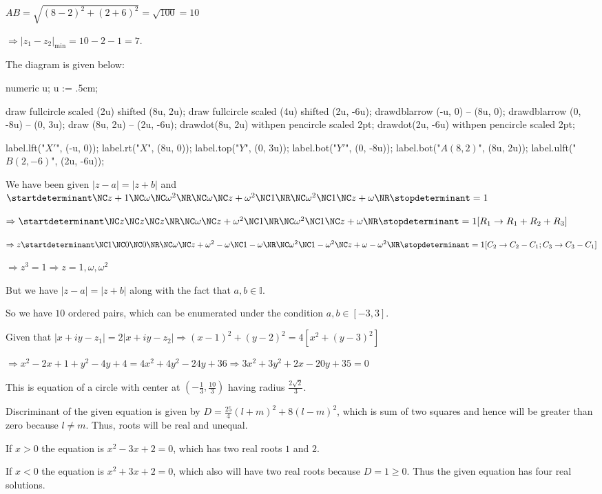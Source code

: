   $AB = \sqrt{(8 - 2)^2 + (2 + 6)^2} = \sqrt{100} = 10$

  $\Rightarrow |z_1 - z_2|_{\min} = 10 - 2 - 1 = 7$.

  The diagram is given below:

  \startplacefigure[location=force]
    \startMPcode
      numeric u;
      u := .5cm;

      draw fullcircle scaled (2u) shifted (8u, 2u);
      draw fullcircle scaled (4u) shifted (2u, -6u);
      drawdblarrow (-u, 0) -- (8u, 0);
      drawdblarrow (0, -8u) -- (0, 3u);
      draw (8u, 2u) -- (2u, -6u);
      drawdot(8u, 2u) withpen pencircle scaled 2pt;
      drawdot(2u, -6u) withpen pencircle scaled 2pt;

      label.lft("$X'$", (-u, 0));
      label.rt("$X$", (8u, 0));
      label.top("$Y$", (0, 3u));
      label.bot("$Y'$", (0, -8u));
      label.bot("$A(8, 2)$", (8u, 2u));
      label.ulft("$B(2, -6)$", (2u, -6u));
    \stopMPcode
  \stopplacefigure
\item We have been given $|z - a| = |z + b|$ and $\startdeterminant\NC z +
  1\NC \omega\NC \omega^2 \NR\NC \omega\NC z + \omega^2 \NC 1\NR\NC \omega^2\NC 1\NC z
  + \omega\NR\stopdeterminant = 1$

  $\Rightarrow \startdeterminant\NC z \NC z\NC z \NR\NC \omega\NC z + \omega^2 \NC 1\NR\NC \omega^2\NC 1\NC
  z + \omega\NR\stopdeterminant = 1[R_1\rightarrow R_1 + R_2 + R_3]$

  $\Rightarrow z\startdeterminant\NC 1\NC 0\NC 0\NR\NC \omega\NC z + \omega^2 - \omega\NC 1
  - \omega\NR\NC \omega^2 \NC 1 - \omega^2\NC z + \omega -\omega^2\NR\stopdeterminant = 1[C_2\rightarrow C_2
    - C_1; C_3\rightarrow C_3 - C_1]$

  $\Rightarrow z^3 = 1 \Rightarrow z = 1, \omega, \omega^2$

  But we have $|z - a| = |z + b|$ along with the fact that $a, b\in\mathbb{I}$.

  So we have $10$ ordered pairs, which can be enumerated under the condition $a,b\in[-3, 3]$.
\item Given that $ |x + iy - z_1| = 2|x + iy - z_2| \Rightarrow (x - 1)^2 + (y - 2)^2 = 4 [x^2 + (y - 3)^2]$

  $\Rightarrow x^2 - 2x + 1 + y^2 - 4y + 4 = 4x^2 + 4y^2 - 24y + 36 \Rightarrow 3x^2 + 3y^2 + 2x - 20y + 35
  = 0$

  This is equation of a circle with center at $\left(-\frac{1}{3}, \frac{10}{3}\right)$ having radius
  $\frac{2\sqrt{2}}{3}$.
\item Discriminant of the given equation is given by $D = \frac{25}{4}(l + m)^2 + 8(l - m)^2$, which is sum
  of two squares and hence will be greater than zero because $l\neq m$. Thus, roots will be real and
  unequal.
\item If $x > 0$ the equation is $x^2 - 3x + 2 = 0$, which has two real roots $1$ and $2$.

  If $x < 0$ the equation is $x^2 + 3x + 2 = 0$, which also will have two real roots because $D = 1 \geq 0$.
  Thus the given equation has four real solutions.
\stopitemize
